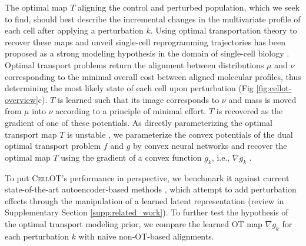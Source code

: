 The optimal map $T$ aligning the control and perturbed population, which we seek to find, should best describe the incremental changes in the multivariate profile of each cell after applying a perturbation $k$.
Using optimal transportation theory \cite{villani2003, santambrogio2015} to recover these maps and unveil single-cell reprogramming trajectories has been proposed as a strong modeling hypothesis in the domain of single-cell biology \cite{schiebinger2019, cang2020, demetci2022, huizing2022, lavenant2023, zhang2021}.
Optimal transport problems return the alignment between distributions $\mu$ and $\nu$ corresponding to the minimal overall cost between aligned molecular profiles, thus determining the most likely state of each cell upon perturbation (Fig \ref{fig:cellot-overview}c).
$T$ is learned such that its image corresponds to $\nu$ and mass is moved from $\mu$ into $\nu$ according to a principle of minimal effort.
$T$ is recovered as the gradient of one of these potentials.
As directly parameterizing the optimal transport map $T$ 
\cite{korotin2020, yang2019, prasad2022} is unstable \citep[Table 1]{makkuva2020}, we parameterize the convex potentials of the dual optimal transport problem $f$ and $g$ by convex neural networks \cite{amos2017} and recover the optimal map $T$ using the gradient of a convex function $g_k$, i.e., $\nabla g_k$ \cite{makkuva2020}.

To put \textsc{CellOT}'s performance in perspective, we benchmark it against current state-of-the-art autoencoder-based methods \cite{lotfollahi2019, lopez2018},
which attempt to add perturbation effects through the manipulation of a learned latent representation (review in Supplementary Section \ref{supp:related_work}).
To further test the hypothesis of the optimal transport modeling prior, we compare the learned OT map $\nabla g_k$ for each perturbation $k$ with naive non-OT-based alignments.



